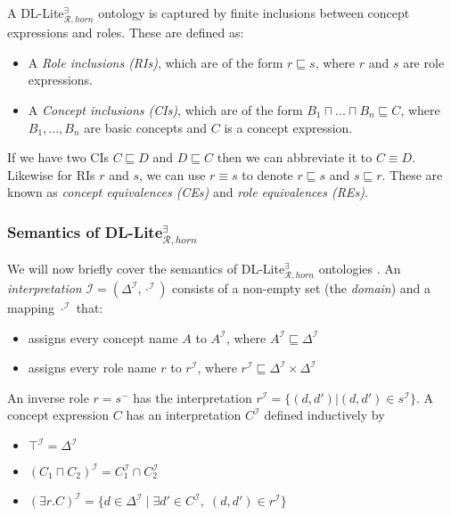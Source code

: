 A DL-Lite$_{\mathcal{R}, horn}^{\exists}$ ontology is captured by finite inclusions between concept expressions and roles. These are defined as: 
\begin{itemize}
    \setlength\itemsep{1em}
    \item A \emph{Role inclusions (RIs)}, which are of the form $r\sqsubseteq s$, where $r$ and $s$ are role expressions.
    \item A \emph{Concept inclusions (CIs)}, which are of the form $B_1 \sqcap ... \sqcap B_n \sqsubseteq C$, where $B_1, ..., B_n$ are basic concepts and $C$ is a concept expression.
\end{itemize}

If we have two CIs $C\sqsubseteq D$ and $D \sqsubseteq C$ then we can abbreviate it to $C \equiv D$. Likewise for RIs $r$ and $s$, we can use $r\equiv s$ to denote $r\sqsubseteq s$ and $s \sqsubseteq r$. These are known as \emph{concept equivalences (CEs)} and \emph{role equivalences (REs)}.

\subsubsection{Semantics of DL-Lite$_{\mathcal{R}, horn}^{\exists}$}
We will now briefly cover the semantics of DL-Lite$_{\mathcal{R}, horn}^{\exists}$ ontologies \cite{baader_horrocks_lutz_sattler_2017}. An \emph{interpretation} $\mathcal{I} = (\Delta^{\mathcal{I}}, \cdot^{\mathcal{I}})$ consists of a non-empty set (the \emph{domain}) and a mapping $\cdot^{\mathcal{I}}$ that:
\begin{itemize}
    \item assigns every concept name $A$ to $A^{\mathcal{I}}$, where $A^{\mathcal{I}}\sqsubseteq \Delta^{\mathcal{I}}$
    \item assigns every role name $r$ to  $r^{\mathcal{I}}$, where $r^{\mathcal{I}}\sqsubseteq \Delta^{\mathcal{I}}\times \Delta^{\mathcal{I}}$
\end{itemize}
An inverse role $r = s^-$ has the interpretation $r^{\mathcal{I}}=\{(d, d') | (d,d')\in s^{\mathcal{I}}\}$. A concept expression $C$ has an interpretation $C^{\mathcal{I}}$ defined inductively by
\begin{itemize}
    \item $ \top^{\mathcal{I}} = \Delta^{\mathcal{I}} $
    \item $ (C_{1} \sqcap C_{2})^{\mathcal{I}} = C_{1}^{\mathcal{I}} \cap C_{2}^{\mathcal{I}} $
    \item $ (\exists r.C)^{\mathcal{I}} = \{d\in \Delta ^{\mathcal{I}}\;|\; \exists d' \in C^{\mathcal{I}}, \; (d,d')\in r^{\mathcal{I}}\} $
\end{itemize}

